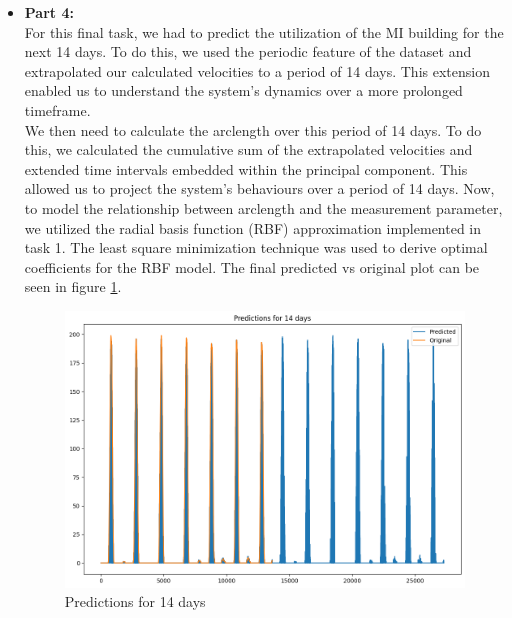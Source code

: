 \begin{itemize}
\item \textbf{Part 4:}\\
For this final task, we had to predict the utilization of the MI building for the next 14 days. To do this, we used the periodic feature of the dataset and extrapolated our calculated velocities to a period of 14 days. This extension enabled us to understand the system's dynamics over a more prolonged timeframe.\\
We then need to calculate the arclength over this period of 14 days. To do this, we calculated the cumulative sum of the extrapolated velocities and extended time intervals embedded within the principal component. This allowed us to project the system's behaviours over a period of 14 days. Now, to model the relationship between arclength and the measurement parameter, we utilized the radial basis function (RBF) approximation implemented in task 1. The least square minimization technique was used to derive optimal coefficients for the RBF model. The final predicted vs original plot can be seen in figure \ref{fig:task5_4_final}.


\begin{figure}[H]
    \centering
    \includegraphics[width=0.9\linewidth]{images/Ex5task5_42.png}
    \caption{Predictions for 14 days}
    \label{fig:task5_4_final}
\end{figure}




\end{itemize}